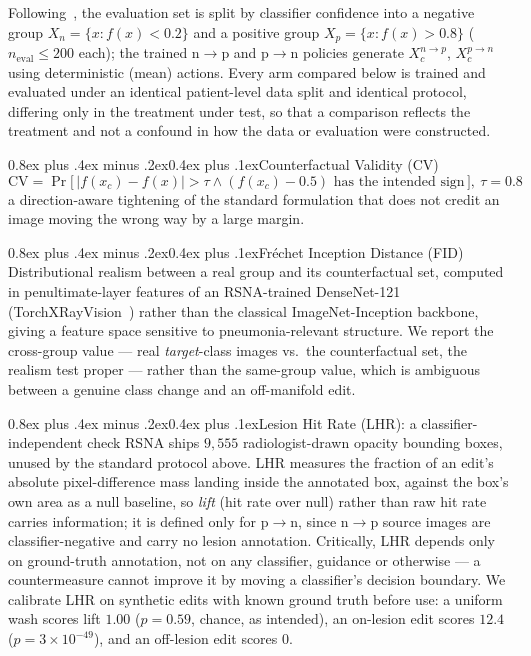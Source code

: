 \documentclass[10pt,twocolumn]{article}
\makeatletter
\renewcommand\subsection{\@startsection{subsection}{2}{\z@}%
  {0.8ex plus .4ex minus .2ex}{0.4ex plus .1ex}{\normalfont\normalsize\bfseries}}
\makeatother
\begin{document}
Following~\cite{singla2022}, the evaluation set is split by classifier
confidence into a negative group $X_n=\{x:f(x)<0.2\}$ and a positive
group $X_p=\{x:f(x)>0.8\}$ ($n_{\text{eval}}\le200$ each); the trained
n$\to$p and p$\to$n policies generate $X_c^{n\to p}$, $X_c^{p\to n}$
using deterministic (mean) actions. Every arm compared below is trained
and evaluated under an identical patient-level data split and identical
protocol, differing only in the treatment under test, so that a
comparison reflects the treatment and not a confound in how the data or
evaluation were constructed.

\subsection{Counterfactual Validity (CV)}
\[
\mathrm{CV}=\Pr\big[\,|f(x_c)-f(x)|>\tau \wedge (f(x_c)-0.5)\text{ has the
intended sign}\,\big],\ \tau=0.8
\]
a direction-aware tightening of the standard formulation that does not
credit an image moving the wrong way by a large margin.

\subsection{Fr\'echet Inception Distance (FID)}
Distributional realism between a real group and its counterfactual set,
computed in penultimate-layer features of an RSNA-trained DenseNet-121
(TorchXRayVision~\cite{cohen2020xrv}) rather than the classical
ImageNet-Inception backbone, giving a feature space sensitive to
pneumonia-relevant structure. We report the cross-group value — real
\emph{target}-class images vs.\ the counterfactual set, the realism test
proper — rather than the same-group value, which is ambiguous between a
genuine class change and an off-manifold edit.

\subsection{Lesion Hit Rate (LHR): a classifier-independent check}
RSNA ships $9{,}555$ radiologist-drawn opacity bounding boxes, unused by
the standard protocol above. LHR measures the fraction of an edit's
absolute pixel-difference mass landing inside the annotated box, against
the box's own area as a null baseline, so \emph{lift} (hit rate over
null) rather than raw hit rate carries information; it is defined only
for p$\to$n, since n$\to$p source images are classifier-negative and
carry no lesion annotation. Critically, LHR depends only on ground-truth
annotation, not on any classifier, guidance or otherwise — a countermeasure
cannot improve it by moving a classifier's decision boundary. We
calibrate LHR on synthetic edits with known ground truth before use: a
uniform wash scores lift $1.00$ ($p=0.59$, chance, as intended), an
on-lesion edit scores $12.4$ ($p=3\times10^{-49}$), and an off-lesion edit
scores $0$.
\end{document}
